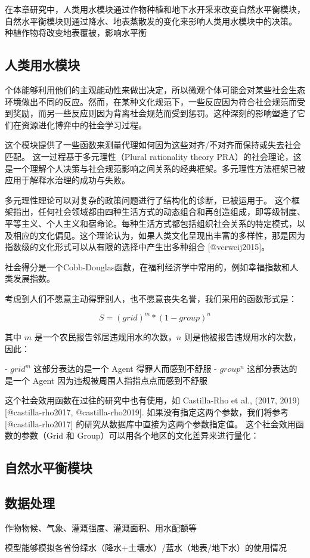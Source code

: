 在本章研究中，人类用水模块通过作物种植和地下水开采来改变自然水平衡模块，自然水平衡模块则通过降水、地表蒸散发的变化来影响人类用水模块中的决策。
种植作物将改变地表覆被，影响水平衡

\subsection{人类用水模块}\label{ch6:sec:society}

个体能够利用他们的主观能动性来做出决定，所以微观个体可能会对某些社会生态环境做出不同的反应。然而，在某种文化规范下，一些反应因为符合社会规范而受到奖励，而另一些反应则因为背离社会规范而受到惩罚。这种深刻的影响塑造了它们在资源进化博弈中的社会学习过程。

这个模块提供了一些函数来测量代理如何因为这些对齐/不对齐而保持或失去社会匹配。
这一过程基于多元理性（Plural rationality theory PRA）的社会理论，这是一个理解个人决策与社会规范影响之间关系的经典框架。多元理性方法框架已被应用于解释水治理的成功与失败。  %

多元理性理论可以对复杂的政策问题进行了结构化的诊断，已被运用于。
这个框架指出，任何社会领域都由四种生活方式的动态组合和再创造组成，即等级制度、平等主义、个人主义和宿命论。每种生活方式都包括组织社会关系的特定模式，以及相应的文化偏见。这个理论认为，如果人类文化呈现出丰富的多样性，那是因为指数级的文化形式可以从有限的选择中产生出多种组合 [@verweij2015]。

社会得分是一个Cobb-Douglas函数，在福利经济学中常用的，例如幸福指数和人类发展指数。

考虑到人们不愿意主动得罪别人，也不愿意丧失名誉，我们采用的函数形式是：

\begin{equation}
    S = {(grid)}^m * {(1 - group)}^n
    \label{ch6:eq:society}
\end{equation}

其中 $m$ 是一个农民报告邻居违规用水的次数，$n$ 则是他被报告违规用水的次数，因此：

- $grid^m$ 这部分表达的是一个 Agent 得罪人而感到不舒服
- $group^n$ 这部分表达的是一个 Agent 因为违规被周围人指指点点而感到不舒服

这个社会效用函数在过往的研究中也有使用，如 Castilla-Rho et al., (2017, 2019) [@castilla-rho2017, @castilla-rho2019]. 如果没有指定这两个参数，我们将参考 [@castilla-rho2017] 的研究从数据库中直接为这两个参数指定值。
这个社会效用函数的参数（Grid 和 Group）可以用各个地区的文化差异来进行量化：


\subsection{自然水平衡模块}

\subsection{数据处理}

作物物候、气象、灌溉强度、灌溉面积、用水配额等

模型能够模拟各省份绿水（降水+土壤水）/蓝水（地表/地下水）的使用情况
